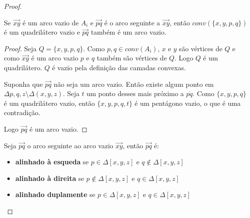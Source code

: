 \begin{proof}

    \begin{fato}\label{fato1}
        Se $\overrightarrow{xy}$ é um arco vazio de $A_i$ e $\overrightarrow{pq}$ é o arco seguinte a $\overrightarrow{xy}$, então $conv(\{x,y,p,q\})$ é um quadrilátero vazio e $\overrightarrow{pq}$ também é um arco vazio.
    \end{fato}
    \begin{proof}
        Seja $Q=\{x,y,p,q\}$. Como $p,q\in conv(A_i)$, $x$ e $y$ são vértices de $Q$ e como $\overrightarrow{xy}$ é um arco vazio $p$ e $q$ também são vértices de $Q$. Logo $Q$ é um quadrilátero. $Q$ é vazio pela definição das camadas convexas.

        Suponha que $\overrightarrow{pq}$ não seja um arco vazio. Então existe algum ponto em $\Delta{p,q,z}\setminus\Delta(x,y,z)$. Seja $t$ um ponto desses mais próximo a $\overline{pq}$. Como $\{x,y,p,q\}$ é um quadrilátero vazio, então $\{x,y,p,q,t\}$ é um pentágono vazio, o que é uma contradição.

        Logo $\overrightarrow{pq}$ é um arco vazio.
    \end{proof}

    Seja $\overrightarrow{pq}$ o arco seguinte ao arco vazio $\overrightarrow{xy}$, então $\overrightarrow{pq}$ é:
    \begin{itemize}
        \item \textbf{alinhado à esqueda} se $p\in\Delta[x,y,z]$ e $q\notin\Delta[x,y,z]$

        \item \textbf{alinhado à direita} se $p\notin\Delta[x,y,z]$ e $q\in\Delta[x,y,z]$
        \item \textbf{alinhado duplamente} se $p\in\Delta[x,y,z]$ e $q\in\Delta[x,y,z]$
    \end{itemize}
\end{proof}
